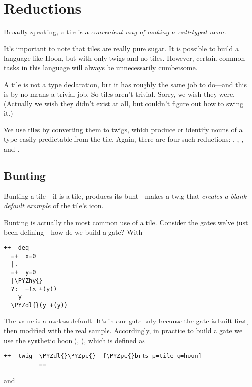 \section{Reductions}

Broadly speaking, a tile is a \emph{convenient way of making a
well-typed noun}.  

It's important to note that tiles are really pure sugar.  It is
possible to build a language like Hoon, but with only twigs and
no tiles.  However, certain common tasks in this language will
always be unnecessarily cumbersome.  

A tile is not a type declaration, but it has roughly the same job
to do---and this is by no means a trivial job.  So tiles aren't
trivial.  Sorry, we wish they were.  (Actually we wish they
didn't exist at all, but couldn't figure out how to swing it.)

We use tiles by converting them to twigs, which produce or
identify nouns of a type easily predictable from the tile.
Again, there are four such reductions: , , , 
and .

\subsection{Bunting}

Bunting a tile---if  is a tile,  produces
its bunt---makes a twig that \emph{creates a blank default example}
of the tile's icon. 

Bunting is actually the most common use of a tile.  Consider the
gates we've just been defining---how do we build a gate?   With

\begin{framed_shaded}
\begin{Verbatim}[fontsize=\relsize{-2.5},fontseries=b,commandchars=\\\{\}]
++  deq
  =+  x=0
  |.  
  =+  y=0
  |\PYZhy{}  
  ?:  =(x +(y))
    y
  \PYZdl{}(y +(y))
\end{Verbatim}
\end{framed_shaded}
The value  is a useless default.  It's in our gate only
because the gate is built first, then modified with the real
sample.  Accordingly, in practice to build a gate we use the
synthetic hoon \kode{\textbar{}=} (, ), which is defined as

\begin{framed_shaded}
\begin{Verbatim}[fontsize=\relsize{-2.5},fontseries=b,commandchars=\\\{\}]
++  twig  \PYZdl{}\PYZpc{}  [\PYZpc{}brts p=tile q=hoon]
          ==
\end{Verbatim}
\end{framed_shaded}
and 

